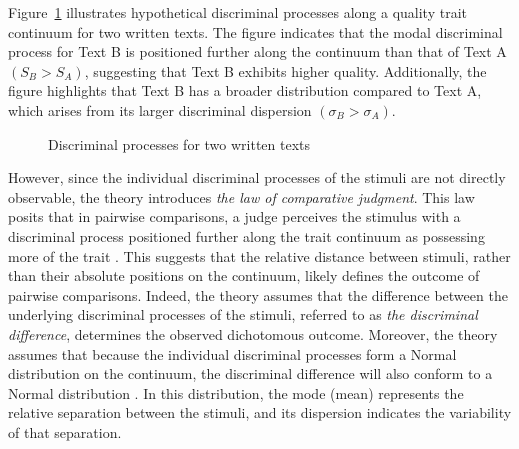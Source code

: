 \documentclass[
  authoryear,
  preprint,
  1p]{elsarticle}
\begin{document}
Figure~\ref{fig-discriminal_process} illustrates hypothetical
discriminal processes along a quality trait continuum for two written
texts. The figure indicates that the modal discriminal process for Text
B is positioned further along the continuum than that of Text A
\((S_{B} > S_{A})\), suggesting that Text B exhibits higher quality.
Additionally, the figure highlights that Text B has a broader
distribution compared to Text A, which arises from its larger
discriminal dispersion \((\sigma_{B} > \sigma_{A})\).

\begin{figure}


\caption{\label{fig-discriminal_process}Discriminal processes for two
written texts}

\end{figure}%

However, since the individual discriminal processes of the stimuli are
not directly observable, the theory introduces \emph{the law of
comparative judgment}. This law posits that in pairwise comparisons, a
judge perceives the stimulus with a discriminal process positioned
further along the trait continuum as possessing more of the trait
\citep[pp.~251]{Bramley_2008}. This suggests that the relative distance
between stimuli, rather than their absolute positions on the continuum,
likely defines the outcome of pairwise comparisons. Indeed, the theory
assumes that the difference between the underlying discriminal processes
of the stimuli, referred to as \emph{the discriminal difference},
determines the observed dichotomous outcome. Moreover, the theory
assumes that because the individual discriminal processes form a Normal
distribution on the continuum, the discriminal difference will also
conform to a Normal distribution \citep{Andrich_1978}. In this
distribution, the mode (mean) represents the relative separation between
the stimuli, and its dispersion indicates the variability of that
separation.
\end{document}
